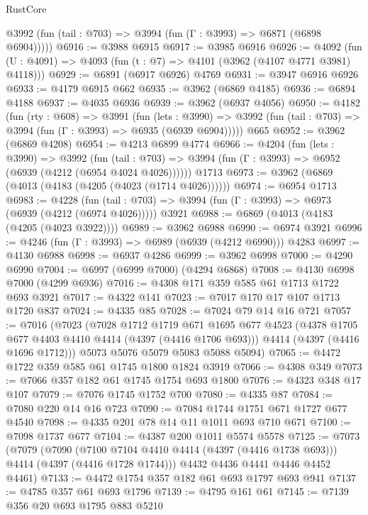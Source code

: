 \begin{lexlean}{RustCore}
\begin{coremodule}
      @3992 (fun (tail : @703) => @3994 (fun (Γ : @3993) => @6871 (@6898 @6904)))))
@6916 := @3988 @6915
@6917 := @3985 @6916
@6926 := @4092 (fun (U : @4091) => @4093 (fun (t : @7) => @4101 (@3962 (@4107 @4771 @3981) @4118)))
@6929 := @6891 (@6917 @6926) @4769
@6931 := @3947 @6916 @6926
@6933 := @4179 @6915 @662
@6935 := @3962 (@6869 @4185)
@6936 := @6894 @4188
@6937 := @4035 @6936
@6939 := @3962 (@6937 @4056)
@6950 := @4182
    (fun (rty : @608) =>
    @3991
      (fun (lets : @3990) =>
      @3992 (fun (tail : @703) => @3994 (fun (Γ : @3993) => @6935 (@6939 @6904)))))
    @665
@6952 := @3962 (@6869 @4208)
@6954 := @4213 @6899 @4774
@6966 := @4204
    (fun (lets : @3990) =>
    @3992
      (fun (tail : @703) => @3994 (fun (Γ : @3993) => @6952 (@6939 (@4212 (@6954 @4024 @4026))))))
    @1713
@6973 := @3962 (@6869 (@4013 (@4183 (@4205 (@4023 (@1714 @4026))))))
@6974 := @6954 @1713
@6983 := @4228
    (fun (tail : @703) => @3994 (fun (Γ : @3993) => @6973 (@6939 (@4212 (@6974 @4026)))))
    @3921
@6988 := @6869 (@4013 (@4183 (@4205 (@4023 @3922))))
@6989 := @3962 @6988
@6990 := @6974 @3921
@6996 := @4246 (fun (Γ : @3993) => @6989 (@6939 (@4212 @6990))) @4283
@6997 := @4130 @6988
@6998 := @6937 @4286
@6999 := @3962 @6998
@7000 := @4290 @6990
@7004 := @6997 (@6999 @7000) (@4294 @6868)
@7008 := @4130 @6998 @7000 (@4299 @6936)
@7016 := @4308 @171 @359 @585 @61 @1713 @1722 @693 @3921
@7017 := @4322 @141
@7023 := @7017 @170 @17 @107 @1713 @1720 @837
@7024 := @4335 @85
@7028 := @7024 @79 @14 @16 @721
@7057 := @7016
    (@7023
      (@7028
        @1712
        @1719
        @671
        @1695
        @677
        @4523
        (@4378 @1705 @677 @4403 @4410 @4414 (@4397 (@4416 @1706 @693)))
        @4414
        (@4397 (@4416 @1696 @1712)))
      @5073
      @5076
      @5079
      @5083
      @5088
      @5094)
@7065 := @4472 @1722 @359 @585 @61 @1745 @1800 @1824 @3919
@7066 := @4308 @349
@7073 := @7066 @357 @182 @61 @1745 @1754 @693 @1800
@7076 := @4323 @348 @17 @107
@7079 := @7076 @1745 @1752 @700
@7080 := @4335 @87
@7084 := @7080 @220 @14 @16 @723
@7090 := @7084 @1744 @1751 @671 @1727 @677 @4540
@7098 := @4335 @201 @78 @14 @11 @1011 @693 @710 @671
@7100 := @7098 @1737 @677
@7104 := @4387 @200 @1011 @5574 @5578
@7125 := @7073
    (@7079
      (@7090 (@7100 @7104 @4410 @4414 (@4397 (@4416 @1738 @693))) @4414 (@4397 (@4416 @1728 @1744)))
      @4432
      @4436
      @4441
      @4446
      @4452
      @4461)
@7133 := @4472 @1754 @357 @182 @61 @693 @1797 @693 @941
@7137 := @4785 @357 @61 @693 @1796
@7139 := @4795 @161 @61
@7145 := @7139 @356 @20 @693 @1795 @883 @5210

\end{coremodule}
\end{lexlean}

